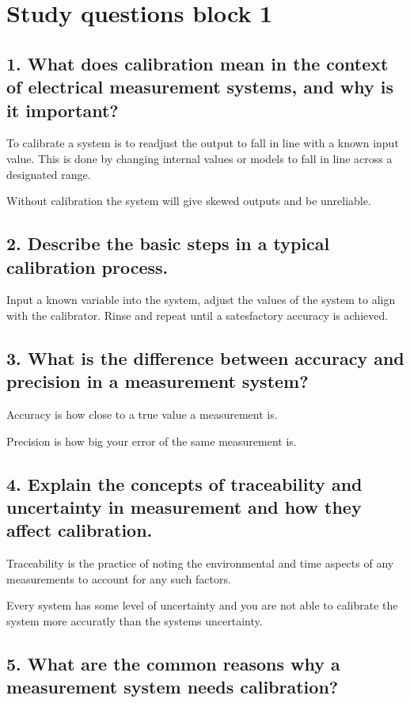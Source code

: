 \section{Study questions block 1}
\subsection{\textbf{1. What does calibration mean in the context of electrical measurement systems, and why is it important?}}
To calibrate a system is to readjust the output to fall in line with a known input value. This is done by changing internal values or models to fall in line across a designated range. 

Without calibration the system will give skewed outputs and be unreliable. 

\subsection{\textbf{2. Describe the basic steps in a typical calibration process.}}
Input a known variable into the system, adjust the values of the system to align with the calibrator. Rinse and repeat until a satesfactory accuracy is achieved.

\subsection{\textbf{3. What is the difference between accuracy and precision in a measurement system?}}
Accuracy is how close to a true value a measurement is.

Precision is how big your error of the same measurement is.
\subsection{\textbf{4. Explain the concepts of traceability and uncertainty in measurement and how they affect calibration.}}
Traceability is the practice of noting the environmental and time aspects of any measurements to account for any such factors. 

Every system has some level of uncertainty and you are not able to calibrate the system more accuratly than the systems uncertainty. 

\subsection{\textbf{5. What are the common reasons why a measurement system needs calibration?}}

